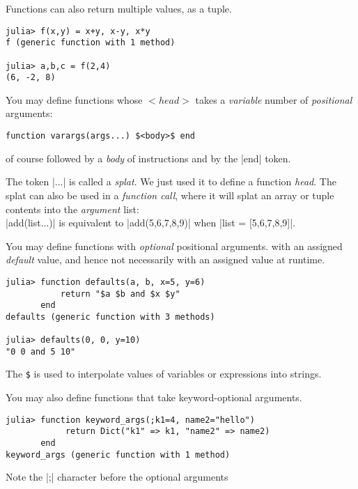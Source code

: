 \begin{definition} Functions can also return multiple values, as a tuple.
\begin{lstlisting}[language=JuliaLocal, style=julia]
julia> f(x,y) = x+y, x-y, x*y
f (generic function with 1 method)

julia> a,b,c = f(2,4) 
(6, -2, 8)
\end{lstlisting}
\end{definition}


\begin{definition} 
You may define functions whose $<head>$ takes a \emph{variable} number of \emph{positional} arguments:
\begin{lstlisting}[language=JuliaLocal, style=julia, mathescape = true]
function varargs(args...) $<body>$ end
\end{lstlisting}
of course followed by a \emph{body} of instructions and by the |end| token. 
\end{definition}

The token |...| is called a \emph{splat}. We just used it to define a function \emph{head}. 
The splat can also be used in a \emph{function call}, where it will splat an array or tuple contents into the \emph{argument} list: \\ |add(list...)| is equivalent to |add(5,6,7,8,9)| when |list = [5,6,7,8,9]|.

\begin{definition} 
You may define functions with \emph{optional} positional arguments.
with an assigned \emph{default} value, and hence not necessarily with an assigned value at runtime. 
\begin{lstlisting}[language=JuliaLocal, style=julia, mathescape=false]
julia> function defaults(a, b, x=5, y=6)
	       return "$a $b and $x $y"
	   end
defaults (generic function with 3 methods)

julia> defaults(0, 0, y=10)
"0 0 and 5 10"
\end{lstlisting}
The \texttt{\$} is used to interpolate values of variables or expressions into strings.
\end{definition} 

\begin{definition} 
You may also define functions that take keyword-optional arguments. \begin{lstlisting}[language=JuliaLocal, style=julia, mathescape=false]
julia> function keyword_args(;k1=4, name2="hello")
            return Dict("k1" => k1, "name2" => name2)
       end
keyword_args (generic function with 1 method)
\end{lstlisting}
Note the |;| character before the optional arguments
\end{definition} 


